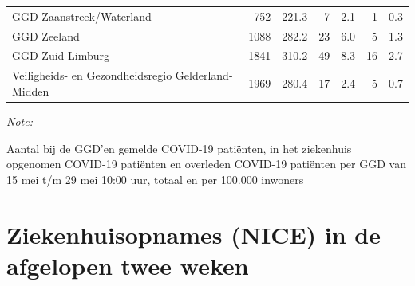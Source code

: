\documentclass[
  english,
  man,floatsintext]{apa6}
\begin{document}
\begin{table}
\begin{threeparttable}
\begin{tabular}{lrrrrrr}
GGD Zaanstreek/Waterland & 752 & 221.3 & 7 & 2.1 & 1 & 0.3\\
GGD Zeeland & 1088 & 282.2 & 23 & 6.0 & 5 & 1.3\\
GGD Zuid-Limburg & 1841 & 310.2 & 49 & 8.3 & 16 & 2.7\\
Veiligheids- en Gezondheidsregio Gelderland-Midden & 1969 & 280.4 & 17 & 2.4 & 5 & 0.7\\
\bottomrule
\end{tabular}
\begin{tablenotes}
\item \textit{Note: } 
\item Aantal bij de GGD’en gemelde COVID-19 patiënten, in het ziekenhuis opgenomen COVID-19 patiënten en overleden COVID-19 patiënten per GGD van 15 mei t/m 29 mei 10:00 uur, totaal en per 100.000 inwoners
\end{tablenotes}
\end{threeparttable}
\endgroup{}
\end{table}

\newpage

\hypertarget{ziekenhuisopnames-nice-in-de-afgelopen-twee-weken}{%
\section{Ziekenhuisopnames (NICE) in de afgelopen twee weken}\label{ziekenhuisopnames-nice-in-de-afgelopen-twee-weken}}
\end{document}
